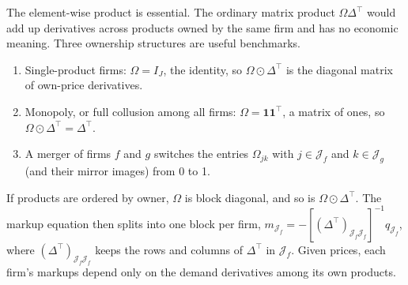 \begin{remark}\label{rem:04-hadamard}
The element-wise product is essential. The ordinary matrix product $\Omega\Delta^\top$ would add up derivatives
across products owned by the same firm and has no economic meaning. Three ownership structures are useful
benchmarks.
\begin{enumerate}[label=(\roman*)]
  \item Single-product firms: $\Omega = I_J$, the identity, so $\Omega \odot \Delta^\top$ is the diagonal matrix of
  own-price derivatives.
  \item Monopoly, or full collusion among all firms: $\Omega = \mathbf{1}\mathbf{1}^\top$, a matrix of ones, so
  $\Omega \odot \Delta^\top = \Delta^\top$.
  \item A merger of firms $f$ and $g$ switches the entries $\Omega_{jk}$ with $j \in \mathcal{J}_f$ and
  $k \in \mathcal{J}_g$ (and their mirror images) from 0 to 1.
\end{enumerate}
If products are ordered by owner, $\Omega$ is block diagonal, and so is $\Omega \odot \Delta^\top$. The markup
equation then splits into one block per firm, $m_{\mathcal{J}_f} = -[(\Delta^\top)_{\mathcal{J}_f\mathcal{J}_f}]^{-1}q_{\mathcal{J}_f}$,
where $(\Delta^\top)_{\mathcal{J}_f\mathcal{J}_f}$ keeps the rows and columns of $\Delta^\top$ in $\mathcal{J}_f$.
Given prices, each firm's markups depend only on the demand derivatives among its own products.
\end{remark}

